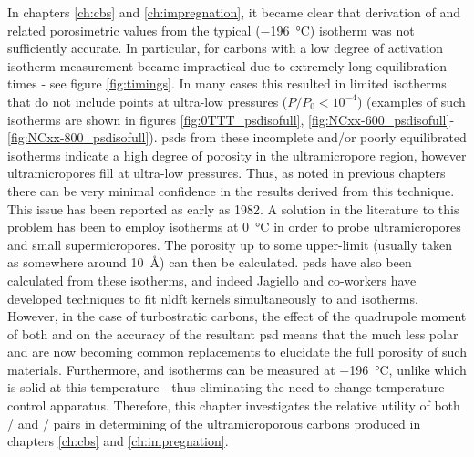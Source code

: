 In chapters \ref{ch:cbs} and \ref{ch:impregnation}, it became clear that derivation of  and related porosimetric values from the typical  (\qty{-196}{\degreeCelsius}) isotherm was not sufficiently accurate. In particular, for carbons with a low degree of activation isotherm measurement became impractical due to extremely long equilibration times - see figure \ref{fig:timings}. In many cases this resulted in limited isotherms that do not include points at ultra-low pressures ($P/P_0 < 10^{-4}$) (examples of such isotherms are shown in figures \ref{fig:0TTT_psdisofull}, \ref{fig:NCxx-600_psdisofull}-\ref{fig:NCxx-800_psdisofull}). \acrshort{psd}s from these incomplete and/or poorly equilibrated isotherms indicate a high degree of porosity in the \gls{ultramicropore} region, however \glspl{ultramicropore} fill at ultra-low pressures. Thus, as noted in previous chapters there can be very minimal confidence in the results derived from this technique. This issue has been reported as early as 1982.\citep{RodriguezReinoso1982Activated} A solution in the literature to this problem has been to employ  isotherms at \qty{0}{\degreeCelsius} in order to probe \glspl{ultramicropore} and small \glspl{supermicropore}.\citep{Jagiello2004Comparison, Jagiello2015Dual, Garrido1987Use, LozanoCastello2004Usefulness} The porosity up to some upper-limit (usually taken as somewhere around \qty{10}{\angstrom}) can then be calculated.\citep{furimsky2000characterization, sing1989use} \acrshort{psd}s have also been calculated from these isotherms,\citep{Jagiello2004Comparison} and indeed Jagiello and co-workers have developed techniques to fit \acrshort{nldft} kernels simultaneously to  and  isotherms.\citep{Jagiello2019Enhanced, Jagiello2015Dual} However, in the case of \glspl{turbostratic carbon}, the effect of the quadrupole moment of both  and  on the accuracy of the resultant \acrshort{psd} means that the much less polar  and  are now becoming common replacements to elucidate the full porosity of such materials.\citep{Jagiello2020Exploiting, Blankenship2022Confirmation, GrauMarin2020Evaluation} Furthermore,  and  isotherms can be measured at \qty{-196}{\degreeCelsius}, unlike  which is solid at this temperature - thus eliminating the need to change temperature control apparatus. Therefore, this chapter investigates the relative utility of both / and / pairs in determining  of the ultramicroporous carbons produced in chapters \ref{ch:cbs} and \ref{ch:impregnation}.

